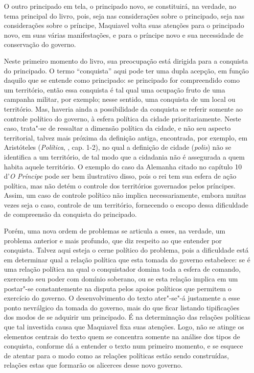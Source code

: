 O outro principado em tela, o principado novo, se constituirá, na
verdade, no tema principal do livro, pois, seja nas considerações sobre
o principado, seja nas considerações sobre o príncipe, Maquiavel volta
suas atenções para o principado novo, em suas várias manifestações, e
para o príncipe novo e sua necessidade de conservação do governo.

Neste primeiro momento do livro, sua preocupação está dirigida para a
conquista do principado. O termo ``conquista'' aqui pode ter uma dupla
acepção, em função daquilo que se entende como principado: se principado
for compreendido como um território, então essa conquista é tal qual uma
ocupação fruto de uma campanha militar, por exemplo; nesse sentido, uma
conquista de um local ou território. Mas, haveria ainda a possibilidade
da conquista se referir somente ao controle político do governo, à
esfera política da cidade prioritariamente. Neste caso, trata"-se de
ressaltar a dimensão política da cidade, e não seu aspecto territorial,
talvez mais próxima da definição antiga, encontrada, por exemplo, em
Aristóteles (\emph{Política}, , cap. 1-2), no qual a definição de
cidade (\emph{polis}) não se identifica a um território, de tal modo que
a cidadania não é assegurada a quem habita aquele território. O exemplo
do caso da Alemanha citado no capítulo 10 d'\emph{O Príncipe} pode ser
bem ilustrativo disso, pois o rei tem sua esfera de ação política, mas
não detém o controle dos territórios governados pelos príncipes. Assim,
um caso de controle político não implica necessariamente, embora muitas
vezes seja o caso, controle de um território, fornecendo o escopo dessa
dificuldade de compreensão da conquista do principado.

Porém, uma nova ordem de problemas se articula a esses, na verdade, um
problema anterior e mais profundo, que diz respeito ao que entender por
conquista. Talvez aqui esteja o cerne político do problema, pois a
dificuldade está em determinar qual a relação política que esta tomada
do governo estabelece: se é uma relação política na qual o conquistador
domina toda a esfera de comando, exercendo seu poder com domínio
soberano, ou se esta relação implica em um postar"-se constantemente na
disputa pelos apoios políticos que permitem o exercício do governo. O
desenvolvimento do texto ater"-se"-á justamente a esse ponto nevrálgico da
tomada do governo, mais do que ficar listando tipificações dos modos de
se adquirir um principado. É na determinação das relações políticas que
tal investida causa que Maquiavel fixa suas atenções. Logo, não se
atinge os elementos centrais do texto quem se concentra somente na
análise dos tipos de conquista, conforme dá a entender o texto num
primeiro momento, e se esquece de atentar para o modo como as relações
políticas estão sendo construídas, relações estas que formarão os
alicerces desse novo governo.

